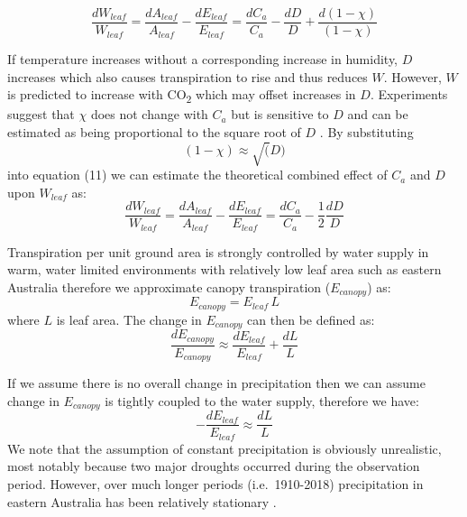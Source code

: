 \documentclass[gc, manuscript]{copernicus}
\begin{document}
\begin{equation}
\frac{dW_{leaf}}{W_{leaf}}=\frac{dA_{leaf}}{A_{leaf}} - \frac{dE_{leaf}}{E_{leaf}} = \frac{dC_a}{C_a} - \frac{dD}{D} + \frac{d(1-\chi)}{(1-\chi)}
\end{equation}

If temperature increases without a corresponding increase in humidity,
\(D\) increases which also causes transpiration to rise and thus reduces
\(W\). However, \(W\) is predicted to increase with CO\textsubscript{2}
which may offset increases in \(D\). Experiments suggest that \(\chi\)
does not change with \(C_a\) but is sensitive to \(D\)
\citep{wong_etal85, drake_etal97} and can be estimated as being
proportional to the square root of \(D\)
\citep{medlynReconcilingOptimalEmpirical2011d}. By substituting
\[(1-\chi) \approx \sqrt(D)\] into equation (11) we can estimate the
theoretical combined effect of \(C_a\) and \(D\) upon \(W_{leaf}\) as:
\begin{equation}
\frac{dW_{leaf}}{W_{leaf}}=\frac{dA_{leaf}}{A_{leaf}} - \frac{dE_{leaf}}{E_{leaf}} = \frac{dC_a}{C_a} - \frac{1}{2}\frac{dD}{D}
\end{equation}

Transpiration per unit ground area is strongly controlled by water
supply in warm, water limited environments with relatively low leaf area
such as eastern Australia \citep{spechtWaterUsePerennial1972} therefore
we approximate canopy transpiration (\(E_{canopy}\)) as:
\begin{equation}
E_{canopy}=E_{leaf}\,L
\end{equation} where \(L\) is leaf area. The change in \(E_{canopy}\)
can then be defined as: \begin{equation}
\frac{dE_{canopy}}{E_{canopy}} \approx \frac{dE_{leaf}}{E_{leaf}}+\frac{dL}{L}
\end{equation}

If we assume there is no overall change in precipitation then we can
assume change in \(E_{canopy}\) is tightly coupled to the water supply,
therefore we have: \begin{equation}
-\frac{dE_{leaf}}{E_{leaf}} \approx \frac{dL}{L}
\end{equation} We note that the assumption of constant precipitation is
obviously unrealistic, most notably because two major droughts occurred
during the observation period. However, over much longer periods
(i.e.~1910-2018) precipitation in eastern Australia has been relatively
stationary \citep{ukkolaExploringStationarityAustralian2019c}.
\end{document}
